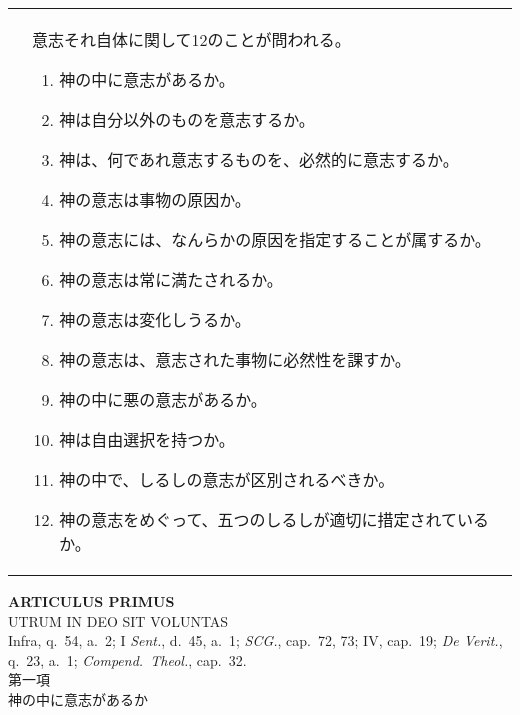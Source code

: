 \documentclass[10pt]{jsarticle} %
\begin{document}
\begin{longtable}{p{21em}p{21em}}
&

意志それ自体に関して12のことが問われる。
 
\begin{enumerate}
 \item 神の中に意志があるか。
 \item 神は自分以外のものを意志するか。
 \item 神は、何であれ意志するものを、必然的に意志するか。
 \item 神の意志は事物の原因か。
 \item 神の意志には、なんらかの原因を指定することが属するか。
 \item 神の意志は常に満たされるか。
 \item 神の意志は変化しうるか。
 \item 神の意志は、意志された事物に必然性を課すか。
 \item 神の中に悪の意志があるか。
 \item 神は自由選択を持つか。
 \item 神の中で、しるしの意志が区別されるべきか。
 \item 神の意志をめぐって、五つのしるしが適切に措定されているか。
\end{enumerate}


\end{longtable}



\newpage

\begin{center}
 {\Large {\bf ARTICULUS PRIMUS}}\\
 {\large UTRUM IN DEO SIT VOLUNTAS}\\
 {\footnotesize Infra, q.~54, a.~2; I {\itshape Sent.}, d.~45, a.~1;
 {\itshape SCG.}, cap.~72, 73; IV, cap.~19; {\itshape De Verit.}, q.~23,
 a.~1; {\itshape Compend.~Theol.}, cap.~32.}\\
 {\Large 第一項\\神の中に意志があるか}
\end{center}
\end{document}
